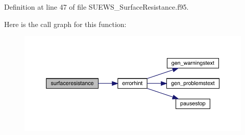 Definition at line 47 of file S\+U\+E\+W\+S\+\_\+\+Surface\+Resistance.\+f95.

Here is the call graph for this function\+:\nopagebreak
\begin{figure}[H]
\begin{center}
\leavevmode
\includegraphics[width=350pt]{_s_u_e_w_s___surface_resistance_8f95_a4da071a736ca3e2e388c9f1f3b3e6ea7_cgraph}
\end{center}
\end{figure}
